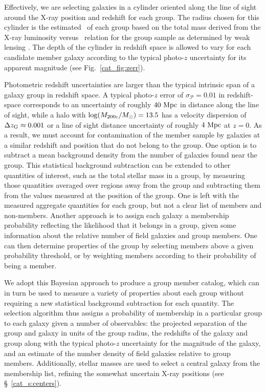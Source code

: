 Effectively, we are selecting galaxies in a cylinder oriented along
the line of sight around the X-ray position and redshift for each
group. The radius chosen for this cylinder is the estimated \rvir\ of
each group based on the total mass derived from the X-ray luminosity
versus \mvir\ relation for the group sample as determined by weak
lensing \citep{Leauthaud2010}. The depth of the cylinder
in redshift space is allowed to vary for each candidate member galaxy
according to the typical photo-$z$ uncertainty for its apparent
magnitude (see Fig.~\ref{cat_fig:zerr}).

Photometric redshift uncertainties are larger than the typical intrinsic span
of a galaxy group in redshift space. A typical photo-$z$ error of
$\sigma_{\mathcal{P}} = 0.01$ in redshift-space corresponds to an uncertainty
of roughly $40~\rm{Mpc}$ in distance along the line of sight, while a halo with
$\log(\mbox{$M_{200\rm{c}}$}/M_{\odot})=13.5$ has a velocity dispersion of $\Delta\mbox{$z_{\rm G}$}
\approx 0.001$ \citep{Evrard2008} or a line of sight distance
uncertainty of roughly $4~\rm{Mpc}$ at $z=0$. As a result, we must 
account for contamination of the member sample by galaxies at a similar
redshift and position that do not belong to the group. One option is
to subtract a mean background density from the number of galaxies
found near the group. This statistical background subtraction can be
extended to other quantities of interest, such as the total stellar
mass in a group, by measuring those quantities averaged over regions
away from the group and subtracting them from the values measured
at the position of the group. One is left with the measured aggregate quantities
for each group, but not a clear list of members and non-members. 
Another approach is to assign each galaxy a membership probability
reflecting the likelihood that it belongs in a group, given some
information about the relative number of field galaxies and group
members. One can then determine properties of the group by selecting
members above a given probability threshold, or by weighting members
according to their probability of being a member.

We adopt this Bayesian approach to produce a group member
catalog, which can in turn be used to measure a variety of properties
about each group without requiring a new statistical background
subtraction for each quantity. The selection algorithm thus assigns a
probability of membership in a particular group to each galaxy given a
number of observables: the projected separation of the group and
galaxy in units of the group radius, the redshifts of the galaxy and
group along with the typical photo-$z$ uncertainty for the magnitude of
the galaxy, and an estimate of the number density of field galaxies
relative to group members. Additionally, stellar masses are used to
select a central galaxy from the membership list, refining the somewhat
uncertain X-ray positions (see \S~\ref{cat_s:centers}).


